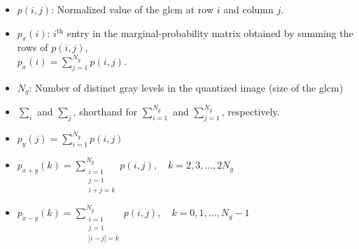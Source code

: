 \begin{itemize}

  \item $p(i,j)$: Normalized value of the \ac{glcm} at row $i$ and column $j$.
  
  \item $p_x(i)$: $i$$^{\text{th}}$ entry in the marginal-probability matrix obtained by summing the rows of $p(i,j)$,\\
  $p_x(i) = \sum_{j=1}^{N_g} p(i,j)$.
  
  \item $N_g$: Number of distinct gray levels  in the quantized
 image (size of the \ac{glcm})
  
  \item $\sum_i$ and $\sum_j$, shorthand for $\sum_{i=1}^{N_g}$ and $\sum_{j=1}^{N_g}$, respectively.
  
  \item $p_y(j) = \sum_{i=1}^{N_g} p(i,j)$
  
  \item $p_{x+y}(k) = \sum_{\substack{i=1 \\ j=1 \\ i+j=k}}^{N_g} p(i,j), \quad k = 2,3,\ldots,2N_g$
  
  \item $p_{x-y}(k) = \sum_{\substack{i=1 \\ j=1 \\ |i-j| = k}}^{N_g} p(i,j), \quad k = 0,1,\ldots,N_g - 1$
\end{itemize}

